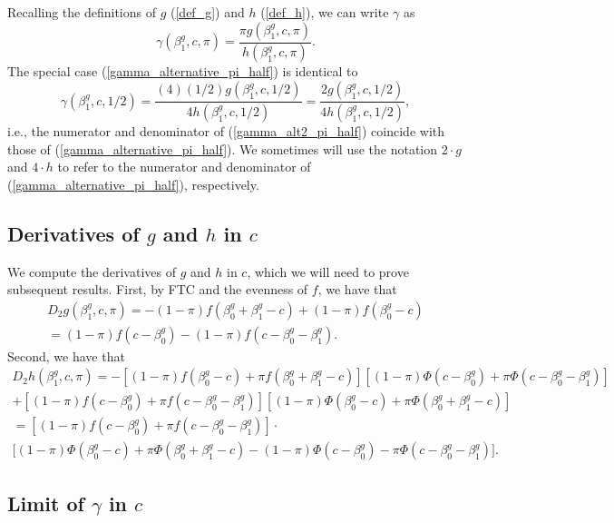 \documentclass[11pt]{article}
\begin{document}
\begin{appendices}
\begin{refsection}
\begin{equation}
\end{equation}
Recalling the definitions of $g$ (\ref{def_g}) and $h$ (\ref{def_h}), we can write $\gamma$ as
$$ \gamma(\beta^g_1, c, \pi) = \frac{\pi g(\beta^g_1, c, \pi)}{h(\beta^g_1, c,\pi)}.$$
The special case (\ref{gamma_alternative_pi_half}) is identical to
\begin{equation}\label{gamma_alt2_pi_half}
\gamma(\beta^g_1, c, 1/2) = \frac{(4)(1/2)g(\beta^g_1, c, 1/2)}{4 h(\beta^g_1, c, 1/2)} = \frac{2 g(\beta^g_1, c, 1/2)}{4h(\beta^g_1, c, 1/2)},
\end{equation}
i.e., the numerator and denominator of  (\ref{gamma_alt2_pi_half}) coincide with those of (\ref{gamma_alternative_pi_half}). We sometimes will use the notation $2\cdot g$ and $4\cdot h$ to refer to the numerator and denominator of (\ref{gamma_alternative_pi_half}), respectively.

\subsection{Derivatives of  $g$ and $h$ in $c$}\label{sec:derivatives}
We compute the derivatives of $g$ and $h$ in $c$, which we will need to prove subsequent results. First, by FTC and the evenness of $f$, we have that
\begin{multline}\label{dg_dc}
D_2 g(\beta^g_1, c, \pi) = -(1-\pi)f( \beta^g_0 + \beta^g_1 - c ) + (1-\pi) f(\beta^g_0 - c) \\ = (1-\pi) f(c - \beta^g_0) - (1-\pi)f(c - \beta^g_0 - \beta^g_1).
\end{multline}
Second, we have that
\begin{multline}\label{dh_dc}
D_2 h(\beta^g_1, c, \pi) = -[(1-\pi)f(\beta^g_0 - c) + \pi f( \beta^g_0 + \beta^g_1 - c )]\left[(1-\pi)\Phi(c - \beta^g_0) + \pi \Phi(c - \beta_0^g - \beta_1^g)  \right] \\ + [(1-\pi) f(c - \beta^g_0) +  \pi f(c - \beta^g_0 - \beta^g_1)] \left[(1-\pi) \Phi(\beta_0^g - c) + \pi \Phi(\beta^g_0 + \beta^g_1 - c) \right] \\ = \left[ (1-\pi) f(c - \beta^g_0) +  \pi f(c - \beta^g_0 - \beta^g_1) \right] \cdot \\ \bigg[ (1-\pi) \Phi(\beta_0^g - c) + \pi\Phi(\beta^g_0 + \beta^g_1 - c) - (1-\pi) \Phi(c - \beta^g_0) - \pi \Phi(c - \beta_0^g - \beta_1^g) \bigg].
\end{multline}

\subsection{Limit of $\gamma$ in $c$}\label{sec:c_limit}


\end{refsection}
\end{appendices}
\end{document}
